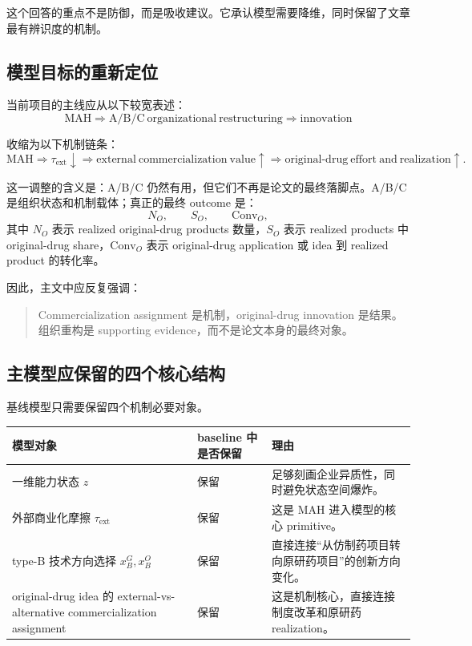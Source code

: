 \documentclass[12pt]{article}
\newcommand{\tauext}{\tau_{\mathrm{ext}}}
\newcommand{\Conv}{\mathrm{Conv}}
\begin{document}
这个回答的重点不是防御，而是吸收建议。它承认模型需要降维，同时保留了文章最有辨识度的机制。

\subsection{模型目标的重新定位}

当前项目的主线应从以下较宽表述：
\[
\mathrm{MAH}\Rightarrow \mathrm{A/B/C\ organizational\ restructuring}\Rightarrow \mathrm{innovation}
\]

收缩为以下机制链条：
\[
\mathrm{MAH}\Rightarrow \tauext \downarrow
\Rightarrow \mathrm{external\ commercialization\ value}\uparrow
\Rightarrow \mathrm{original\text{-}drug\ effort\ and\ realization}\uparrow.
\]

这一调整的含义是：A/B/C 仍然有用，但它们不再是论文的最终落脚点。A/B/C 是组织状态和机制载体；真正的最终 outcome 是：
\[
N_O,\qquad S_O,\qquad \Conv_O,
\]
其中 $N_O$ 表示 realized original-drug products 数量，$S_O$ 表示 realized products 中 original-drug share，$\Conv_O$ 表示 original-drug application 或 idea 到 realized product 的转化率。

因此，主文中应反复强调：
\begin{quote}
Commercialization assignment 是机制，original-drug innovation 是结果。组织重构是 supporting evidence，而不是论文本身的最终对象。
\end{quote}

\subsection{主模型应保留的四个核心结构}

基线模型只需要保留四个机制必要对象。

\begin{longtable}{p{}p{}p{}}
\toprule
模型对象 & baseline 中是否保留 & 理由 \\
\midrule
一维能力状态 $z$ & 保留 & 足够刻画企业异质性，同时避免状态空间爆炸。 \\
\addlinespace
外部商业化摩擦 $\tauext$ & 保留 & 这是 MAH 进入模型的核心 primitive。 \\
\addlinespace
type-B 技术方向选择 $x_B^G,x_B^O$ & 保留 & 直接连接“从仿制药项目转向原研药项目”的创新方向变化。 \\
\addlinespace
original-drug idea 的 external-vs-alternative commercialization assignment & 保留 & 这是机制核心，直接连接制度改革和原研药 realization。 \\
\bottomrule
\end{longtable}
\end{document}
